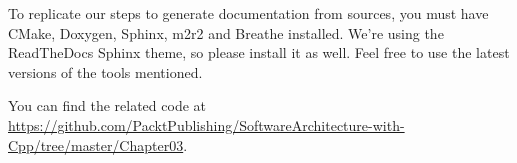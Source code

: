 To replicate our steps to generate documentation from sources, you must have CMake, Doxygen, Sphinx, m2r2 and Breathe installed. We're using the ReadTheDocs Sphinx theme, so please install it as well. Feel free to use the latest versions of the tools mentioned.

You can find the related code at \url{https://github.com/PacktPublishing/SoftwareArchitecture-with-Cpp/tree/master/Chapter03}.